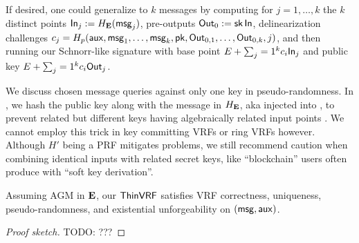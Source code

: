 If desired, one could generalize \ThinVRF to $k$ messages by
computing for $j=1,\ldots,k$ the $k$ distinct
points ${\mathsf{In}}_j := H_{{\mathbf{E}}}(\mathsf{msg}_j)$, pre-outputs ${\mathsf{Out}}_0 := \mathsf{sk} \, {\mathsf{In}}$,
delinearization challenges
 $c_j = H_p(\mathsf{aux},\mathsf{msg}_1,\ldots,\mathsf{msg}_k,\mathsf{pk},{\mathsf{Out}}_{0,1},\ldots,{\mathsf{Out}}_{0,k},j)$,
and then running our Schnorr-like signature with
 base point $E + \sum_j=1^k c_i {\mathsf{In}}_j$ and
 public key $E + \sum_j=1^k c_i {\mathsf{Out}}_j$.


%


We discuss chosen message queries against only one key in pseudo-randomness.  
In \ThinVRF, we hash the public key \pk along with the message \msg
in $H_{\mathbf{E}}$, aka injected \pk into \msg, to prevent
related but different keys having algebraically related input points \In.
We cannot employ this trick in key committing VRFs or ring VRFs however.
Although $H'$ being a PRF mitigates problems, we still recommend caution 
when combining identical inputs \msg with related secret keys,
 like ``blockchain'' users often produce with ``soft key derivation''.

\begin{proposition}\label{prop:thin_vrf}
Assuming AGM in ${\mathbf{E}}$, %
our $\ThinVRF$ satisfies
 VRF correctness, uniqueness, pseudo-randomness,
 and existential unforgeability on $(\msg,\aux)$.
\end{proposition}

\begin{proof}[Proof sketch]
TODO: ???
\end{proof}


\endinput




We expect $\ThinVRF$ to be an EUF-CMA signature scheme on $(\msg,\aux)$ too,
but proving this requires techniques outside our scope, even assuming AGM.

